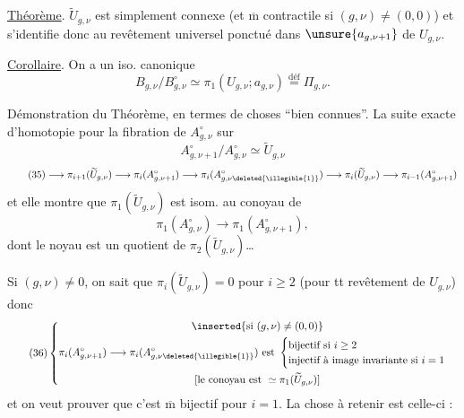 \uline{Théorème}. $\widetilde U_{g,\nu}$ est simplement connexe  (et $\overline{\mathrm m}$ contractile si $(g,\nu)\ne(0,0)$) et s'identifie donc au revêtement universel ponctué dans $\unsure{a_{g,\nu+1}}$ de $U_{g,\nu}$.


\uline{Corollaire}. On a un iso. canonique
\[
\tag{34}
B_{g,\nu}/B_{g,\nu}^{\circ}\simeq\pi_1(U_{g,\nu};a_{g,\nu})\overset{\text{déf}}{=}\Pi_{g,\nu}.
\]

Démonstration du Théorème, en termes de choses ``bien connues''. La  suite exacte d'homotopie pour la fibration de $A_{g,\nu}^{\circ}$ sur
\[
A_{g,\nu+1}^{\circ}/A_{g,\nu}^{\circ}\simeq\widetilde U_{g,\nu}
\]
\[
\tag{35}
\longrightarrow\pi_{i+1}(\widetilde U_{g,\nu})
\longrightarrow\pi_i(A_{g,\nu+1}^{\circ})
\longrightarrow\pi_i(A_{g,\nu\deleted{\illegible{1}}}^{\circ})
\longrightarrow\pi_i(\widetilde U_{g,\nu})
\longrightarrow\pi_{i-1}(A_{g,\nu+1}^{\circ})
\]
et elle montre que $\pi_1(\widetilde U_{g,\nu})$ est isom. au conoyau de
\[
\pi_1(A_{g,\nu}^{\circ})\longrightarrow\pi_1(A_{g,\nu+1}^{\circ}),
\]
dont le noyau est un quotient de $\pi_2(\widetilde U_{g,\nu})$\ldots

Si $(g,\nu)\ne0$, on sait que $\pi_i(\widetilde U_{g,\nu})=0$ pour $i\geq2$ (pour tt revêtement de $U_{g,\nu}$) donc
\[
\tag{36}
\left\{\begin{gathered}
\inserted{\text{si }(g,\nu)\ne(0,0)}\\
\pi_i(A_{g,\nu+1}^{\circ})\longrightarrow\pi_i(A_{g,\nu\deleted{\illegible{1}}}^{\circ})
\text{ est }\begin{cases}
\text{bijectif si }i\geq2\\
\text{injectif à image invariante si }i=1
\end{cases}\\
\text{[le conoyau est }\simeq\pi_1(\widetilde U_{g,\nu})\text{]}
\end{gathered}\right.
\]
et on veut prouver que c'est $\overline{\mathrm m}$ bijectif pour $i=1$. La chose à retenir  est celle-ci :

